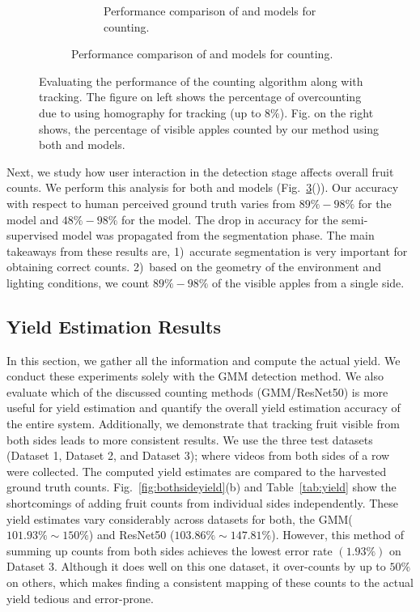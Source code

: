 \begin{figure}[!hbpt]
\begin{subfigure}[b]{\textwidth}
\begin{subfigure}[b]{.49\textwidth}
                 \caption{Performance comparison of  and  models for counting.}
                     \label{fig:dsetcountmodel}   
        \end{subfigure}
        \end{subfigure}       
   \caption[Effectiveness of tracking by homography and detection methods for counting.]{Evaluating the performance of the counting algorithm along with tracking. The figure on left shows the percentage of overcounting due to using homography for tracking (up to $8\%$). Fig. on the right shows, the percentage of visible apples counted by our method using both  and  models.}
   \label{fig:countingtrack}
\end{figure}
 

Next, we study how user interaction in the detection stage affects overall fruit counts. We perform this analysis for both  and  models (Fig.~\ref{fig:countingtrack}()). Our accuracy with respect to human perceived ground truth varies from $89\% - 98\%$ for the  model and $48\% - 98\%$ for the  model. The drop in accuracy for the semi-supervised model was propagated from the segmentation phase. The main takeaways from these results are, 1)~accurate segmentation is very important for obtaining correct counts. 2)~based on the geometry of the environment and lighting conditions, we count $89\% - 98\%$ of the visible apples from a single side.

\subsection{Yield Estimation Results} \label{subsec:yieldMappingexp}
In this section, we gather all the information and compute the actual yield. We conduct these experiments solely with the GMM detection method. We also evaluate which of the discussed counting methods (GMM/ResNet50) is more useful for yield estimation and quantify the overall yield estimation accuracy of the entire system. Additionally, we demonstrate that tracking fruit visible from both sides leads to more consistent results. We use the three test datasets (Dataset 1, Dataset 2, and Dataset 3); where videos from both sides of a row were collected. The computed yield estimates are compared to the harvested ground truth counts.
Fig.~\ref{fig:bothsideyield}(b) and Table~\ref{tab:yield} show the shortcomings of adding fruit counts from individual sides independently. These yield estimates vary considerably across datasets for both, the GMM($101.93\%\sim150\%$) and ResNet50 ($103.86\%\sim147.81\%$). However, this method of summing up counts from both sides achieves the lowest error rate $(1.93\%)$ on Dataset 3. Although it does well on this one dataset, it over-counts by up to $50\%$ on others, which makes finding a consistent mapping of these counts to the actual yield tedious and error-prone.


